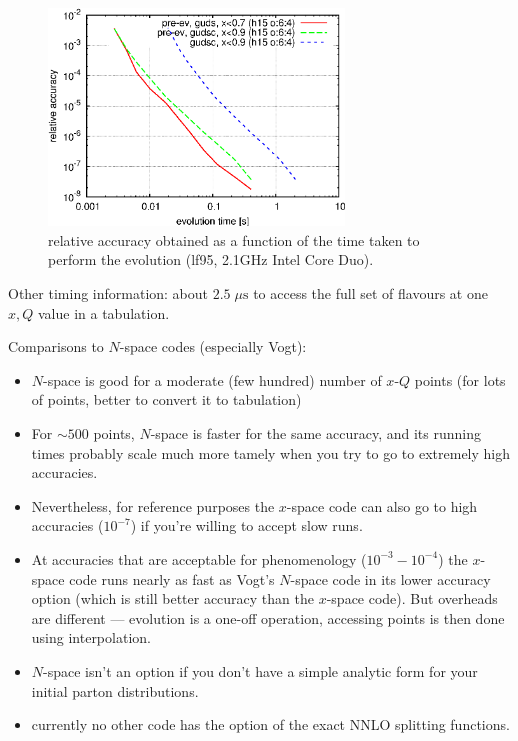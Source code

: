 \documentclass[12pt]{article}
\newcommand{\mus}{\;\mu\mathrm{s}}
\begin{document}
\begin{figure}
  \centering
  \includegraphics[width=0.7\textwidth]{../example_f90/test_acc/acc-v-time.eps}%
  \caption{relative accuracy obtained as a function of the time taken to perform the evolution (lf95, 2.1GHz Intel Core Duo).}
  \label{fig:acc-v-time}
\end{figure}
Other timing information: about $2.5\mus$ to access the full set of
flavours at one $x,Q$ value in a tabulation.

Comparisons to $N$-space codes (especially Vogt):

\begin{itemize}
\item $N$-space is good for a moderate (few hundred) number of $x$-$Q$
  points (for lots of points, better to convert it to tabulation)
%
\item For $\sim 500$ points, $N$-space is faster for the same
  accuracy, and its running times probably scale much more tamely when
  you try to go to extremely high accuracies.
%
\item Nevertheless, for reference purposes the $x$-space code can also
  go to high accuracies ($10^{-7}$) if you're willing to accept slow
  runs.
%
\item At accuracies that are acceptable for phenomenology ($10^{-3} -
  10^{-4}$) the $x$-space code runs nearly as fast as Vogt's $N$-space
  code in its lower accuracy option (which is still better accuracy
  than the $x$-space code). But overheads are different --- evolution
  is a one-off operation, accessing points is then done using
  interpolation.
%
\item $N$-space isn't an option if you don't have a simple analytic
  form for your initial parton distributions.
%
\item currently no other code has the option of the exact NNLO
  splitting functions.
\end{itemize}
\end{document}

